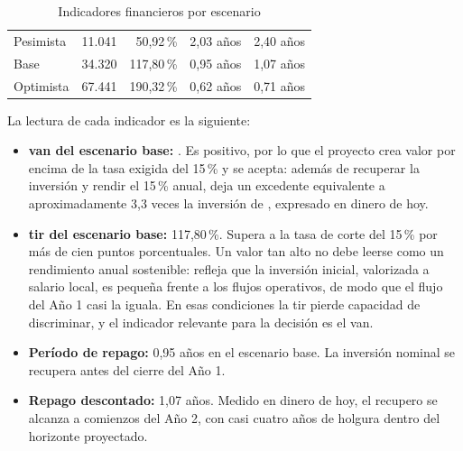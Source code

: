\begin{table}[H]
    \centering
    \caption{Indicadores financieros por escenario}
    \label{tab:indicadores-financieros}
    \small
    \begin{tabularx}{\textwidth}{L r r L L}
        \toprule
         &  &  &  &  \\
        \midrule
        Pesimista & 11.041    & 50{,}92\,\%    & 2,03 años             & 2,40 años \\
        Base      & 34.320    & 117{,}80\,\%   & 0,95 años             & 1,07 años \\
        Optimista & 67.441    & 190{,}32\,\%   & 0,62 años             & 0,71 años \\
        \bottomrule
    \end{tabularx}
\end{table}

La lectura de cada indicador es la siguiente:

\begin{itemize}
    \item \textbf{\gls{van} del escenario base:} . Es
          positivo, por lo que el proyecto crea valor por encima de la tasa
          exigida del 15\,\% y se acepta: además de recuperar la inversión
          y rendir el 15\,\% anual, deja un excedente equivalente a
          aproximadamente 3,3 veces la inversión de ,
          expresado en dinero de hoy.
    \item \textbf{\gls{tir} del escenario base:} 117,80\,\%. Supera a la
          tasa de corte del 15\,\% por más de cien puntos porcentuales.
          Un valor tan alto no debe leerse como un rendimiento anual
          sostenible: refleja que la inversión inicial, valorizada a
          salario local, es pequeña frente a los flujos operativos, de
          modo que el flujo del Año 1 casi la iguala. En esas condiciones
          la \gls{tir} pierde capacidad de discriminar, y el indicador
          relevante para la decisión es el \gls{van}.
    \item \textbf{Período de repago:} 0,95 años en el escenario base. La
          inversión nominal se recupera antes del cierre del Año 1.
    \item \textbf{Repago descontado:} 1,07 años. Medido en dinero de hoy,
          el recupero se alcanza a comienzos del Año 2, con casi cuatro
          años de holgura dentro del horizonte proyectado.
\end{itemize}

